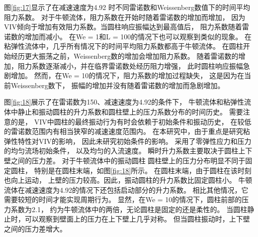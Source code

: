 \documentclass[UTF8,zihao=5]{ctexart} %
\begin{document}
图\ref{fig:17}显示了在减速速度为4.92
时不同雷诺数和Weissenberg数值下的时间平均阻力系数。
对于牛顿流体，阻力系数在开始时随着雷诺数的增加而增加，
因为VIV倾向于增加有效阻力系数。当圆柱响应振幅达到最高值后，
阻力系数随着雷诺数的增加而减小。
在We = 1和L = 100的情况下也可以观察到类似的现象。
在粘弹性流体中，几乎所有情况下的时间平均阻力系数都高于牛顿流体。
在圆柱开始经历更大振荡之前，Weissenberg数的增加会增加阻力系数。
随着雷诺数的增加，阻力系数逐渐减小，并在临界雷诺数处经历阻力增强，
此时圆柱响应振幅急剧增加。
然而，在We = 10的情况下，阻力系数的增加过程缺失，
这是因为在当前Weissenberg数下，
振幅的增加并没有随着雷诺数的增加而急剧增加。

图\ref{fig:18}展示了在雷诺数为150、减速速度为4.92的条件下，
牛顿流体和粘弹性流体中静止和振动圆柱的升力系数和圆柱壁上的压力系数分布的时间历史。
需要注意的是，
VIV中圆柱的最终振动行为有时会依赖于初始条件和振动历史，
在较低的雷诺数范围内有相当狭窄的减速速度范围内。
在本研究中，由于重点是研究粘弹性特性对VIV的影响，
因此未研究初始条件的影响。
采用了零弹性应力和压力的均匀流场初始条件，
以及均匀的入流速度。
瞬时升力系数主要取决于圆柱上下壁之间的压力差。
对于牛顿流体中的振动圆柱
圆柱壁上的压力分布明显不同于固定圆柱，
特别是在圆柱末端，如图\ref{fig:18}所示。
在圆柱末端，由于圆柱在该时刻也向上运动，
上壁的压力较高。因此，振动圆柱的升力系数比固定圆柱小。
牛顿流体在减速速度为4.92的情况下还包括启动部分的升力系数。
相比其他情况，它需要较短的时间才能实现周期行为。
显然，在We = 10的情况下，圆柱前部的压力系数为2.1，
约为牛顿流体中的两倍，无论圆柱是固定的还是柔性的。
当圆柱静止时，可以观察到壁面上的压力在上下壁上几乎对称。
但当圆柱振动时，上下壁之间的压力差增大。
\end{document}
